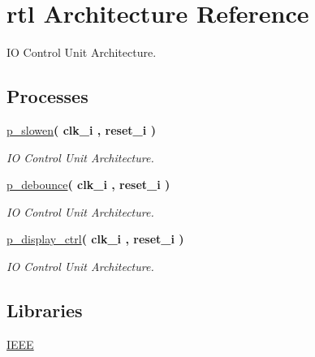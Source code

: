 \hypertarget{classio__ctrl_1_1rtl}{}\section{rtl Architecture Reference}
\label{classio__ctrl_1_1rtl}


IO Control Unit Architecture.  


\subsection*{Processes}
 \begin{DoxyCompactItemize}
\item 
\hyperlink{classio__ctrl_1_1rtl_ae82c89fe12aec7f3a8a04e832dd5cc0e}{p\+\_\+slowen}{\bfseries  ( {\bfseries \textcolor{vhdlchar}{clk\+\_\+i}\textcolor{vhdlchar}{ }} , {\bfseries \textcolor{vhdlchar}{reset\+\_\+i}\textcolor{vhdlchar}{ }} )}
\begin{DoxyCompactList}\small\item\em IO Control Unit Architecture. \end{DoxyCompactList}\item 
\hyperlink{classio__ctrl_1_1rtl_a627aed9352c04ffc84d1b682c4da9ba5}{p\+\_\+debounce}{\bfseries  ( {\bfseries \textcolor{vhdlchar}{clk\+\_\+i}\textcolor{vhdlchar}{ }} , {\bfseries \textcolor{vhdlchar}{reset\+\_\+i}\textcolor{vhdlchar}{ }} )}
\begin{DoxyCompactList}\small\item\em IO Control Unit Architecture. \end{DoxyCompactList}\item 
\hyperlink{classio__ctrl_1_1rtl_a9adae6696d8563868e95204ecd77e739}{p\+\_\+display\+\_\+ctrl}{\bfseries  ( {\bfseries \textcolor{vhdlchar}{clk\+\_\+i}\textcolor{vhdlchar}{ }} , {\bfseries \textcolor{vhdlchar}{reset\+\_\+i}\textcolor{vhdlchar}{ }} )}
\begin{DoxyCompactList}\small\item\em IO Control Unit Architecture. \end{DoxyCompactList}\end{DoxyCompactItemize}
\subsection*{Libraries}
 \begin{DoxyCompactItemize}
\item 
\mbox{\label{classio__ctrl_1_1rtl_ae4f03c286607f3181e16b9aa12d0c6d4}} 
\hyperlink{classio__ctrl_1_1rtl_ae4f03c286607f3181e16b9aa12d0c6d4}{I\+E\+EE} 
\end{DoxyCompactItemize}
